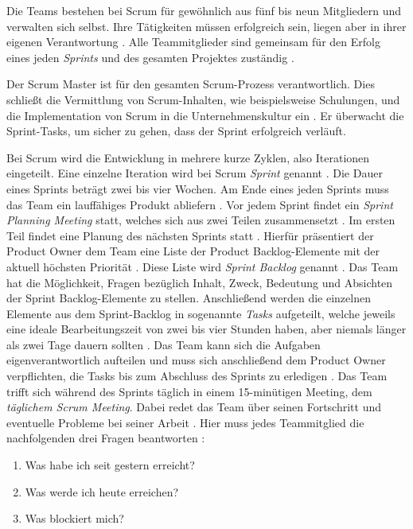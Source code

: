 Die Teams bestehen bei Scrum für gewöhnlich aus fünf bis neun Mitgliedern und verwalten sich selbst. Ihre Tätigkeiten müssen erfolgreich sein, liegen aber in ihrer eigenen Verantwortung \cite{Pries2011, Wolf2011}. Alle Teammitglieder sind gemeinsam für den Erfolg eines jeden \textit{Sprints} und des gesamten Projektes zuständig \cite{Pichler2010}. \newline

Der Scrum Master ist für den gesamten Scrum-Prozess verantwortlich. Dies schließt die Vermittlung von Scrum-Inhalten, wie beispielsweise Schulungen, und die Implementation von Scrum in die Unternehmenskultur ein \cite{Pichler2010}. Er überwacht die Sprint-Tasks, um sicher zu gehen, dass der Sprint erfolgreich verläuft.\newline

Bei Scrum wird die Entwicklung in mehrere kurze Zyklen, also Iterationen eingeteilt. Eine einzelne Iteration wird bei Scrum \textit{Sprint} genannt \cite{Henning2011}. Die Dauer eines Sprints beträgt zwei bis vier Wochen. Am Ende eines jeden Sprints muss das Team ein lauffähiges Produkt abliefern \cite{Wolf2011}. Vor jedem Sprint findet ein \textit{Sprint Planning Meeting} statt, welches sich aus zwei Teilen zusammensetzt \cite{Pichler2010}. Im ersten Teil findet eine Planung des nächsten Sprints statt \cite{Lacey2012}. Hierfür präsentiert der Product Owner dem Team eine Liste der Product Backlog-Elemente mit der aktuell höchsten Priorität \cite{Schwaber2004, Schwaber2007,Pichler2010}. Diese Liste wird \textit{Sprint Backlog} genannt \cite{Wolf2011}. Das Team hat die Möglichkeit, Fragen bezüglich Inhalt, Zweck, Bedeutung und Absichten der Sprint Backlog-Elemente zu stellen. Anschließend werden die einzelnen Elemente aus dem Sprint-Backlog in sogenannte \textit{Tasks} aufgeteilt, welche jeweils eine ideale Bearbeitungszeit von zwei bis vier Stunden haben, aber niemals länger als zwei Tage dauern sollten \cite{Wolf2011}. Das Team kann sich die Aufgaben eigenverantwortlich aufteilen und muss sich anschließend dem Product  Owner verpflichten, die Tasks bis zum Abschluss des Sprints zu erledigen \cite{Wolf2011, Keith2010,Pichler2010}.
Das Team trifft sich während des Sprints täglich in einem 15-minütigen Meeting, dem \textit{täglichem Scrum Meeting}. Dabei redet das Team über seinen Fortschritt und eventuelle Probleme bei seiner Arbeit \cite{Keith2010}. Hier muss jedes Teammitglied die nachfolgenden drei Fragen beantworten \cite{Wolf2011}:
   \begin{enumerate}
      \item Was habe ich seit gestern erreicht?
      \item Was werde ich heute erreichen?
      \item Was blockiert mich?
      \end {enumerate}
      
